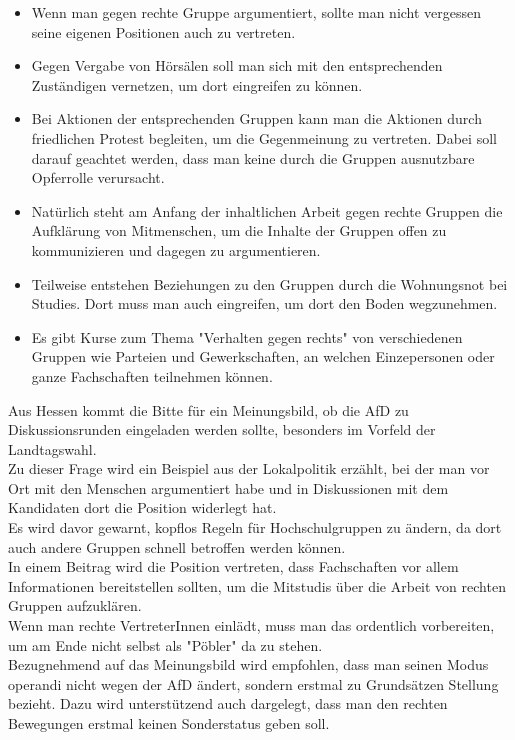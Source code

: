 \begin{itemize}
\item Wenn man gegen rechte Gruppe argumentiert, sollte man nicht vergessen seine eigenen Positionen auch zu vertreten.
\item Gegen Vergabe von Hörsälen soll man sich mit den entsprechenden Zuständigen vernetzen, um dort eingreifen zu können.
\item Bei Aktionen der entsprechenden Gruppen kann man die Aktionen durch friedlichen Protest begleiten, um die Gegenmeinung zu vertreten. Dabei soll darauf geachtet werden, dass man keine durch die Gruppen ausnutzbare Opferrolle verursacht.
\item Natürlich steht am Anfang der inhaltlichen Arbeit gegen rechte Gruppen die Aufklärung von Mitmenschen, um die Inhalte der Gruppen offen zu kommunizieren und dagegen zu argumentieren.
\item Teilweise entstehen Beziehungen zu den Gruppen durch die Wohnungsnot bei Studies. Dort muss man auch eingreifen, um dort den Boden wegzunehmen.
\item Es gibt Kurse zum Thema "Verhalten gegen rechts" von verschiedenen Gruppen wie Parteien und Gewerkschaften, an welchen Einzepersonen oder ganze Fachschaften teilnehmen können.
\end{itemize}
Aus Hessen kommt die Bitte für ein Meinungsbild, ob die AfD zu Diskussionsrunden eingeladen werden sollte, besonders im Vorfeld der Landtagswahl.\\
Zu dieser Frage wird ein Beispiel aus der Lokalpolitik erzählt, bei der man vor Ort mit den Menschen argumentiert habe und in Diskussionen mit dem Kandidaten dort die Position widerlegt hat. \\
Es wird davor gewarnt, kopflos Regeln für Hochschulgruppen zu ändern, da dort auch andere Gruppen schnell betroffen werden können. \\
In einem Beitrag wird die Position vertreten, dass Fachschaften vor allem Informationen bereitstellen sollten, um die Mitstudis über die Arbeit von rechten Gruppen aufzuklären. \\
Wenn man rechte VertreterInnen einlädt, muss man das ordentlich vorbereiten, um am Ende nicht selbst als "Pöbler" da zu stehen. \\
Bezugnehmend auf das Meinungsbild wird empfohlen, dass man seinen Modus operandi nicht wegen der AfD ändert, sondern erstmal zu Grundsätzen Stellung bezieht. Dazu wird unterstützend auch dargelegt, dass man den rechten Bewegungen erstmal keinen Sonderstatus geben soll. \\

